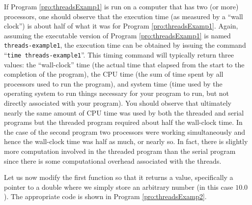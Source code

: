 If Program \ref{pro:threadsExamp1} is run on a computer that has two
(or more) processors, one should observe that the execution time (as
measured by a ``wall clock'') is about half of what it was for Program
\ref{pro:threadsExamp1}.  Again, assuming the executable version of
Program \ref{pro:threadsExamp1} is named {\tt threads-example1}, the
execution time can be obtained by issuing the command ``{\tt time
threads-example1}''.  This timing command will typically return three
values: the ``wall-clock'' time (the actual time that elapsed from the
start to the completion of the program), the CPU time (the sum of time
spent by all processors used to run the program), and system time
(time used by the operating system to run things necessary for your
program to run, but not directly associated with your program).  You
should observe that ultimately nearly the same amount of CPU time was
used by both the threaded and serial programs but the threaded program
required about half the wall-clock time.  In the case of the second
program two processors were working simultaneously and hence the
wall-clock time was half as much, or nearly so.  In fact, there is
slightly more computation involved in the threaded program than the
serial program since there is some computational overhead associated
with the threads.

Let us now modify the first function so that it returns a value,
specifically a pointer to a double where we simply store an arbitrary
number (in this case $10.0$).  The appropriate code is shown in
Program \ref{pro:threadsExamp2}.

